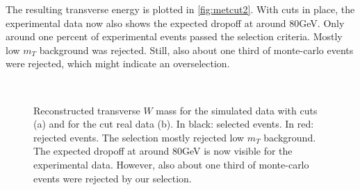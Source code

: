 \documentclass[twoside,        %
               BCOR12mm,       %
               ngerman,english, %
               fleqn,headsepline=false,footsepline=false
              ]{Vorlage/MFPREPORT}
\begin{document}
The resulting transverse energy is plotted in \cref{fig:metcut2}.
With cuts in place, the experimental data now also shows the expected dropoff
at around $80$\;GeV. Only around one percent of experimental events passed the
selection criteria. Mostly low $m_T$ background was rejected. Still, also about
one third of monte-carlo events were rejected, which might indicate an
overselection.

\begin{figure}
     \begin{center}
         \\ %
    \end{center}
    \caption{Reconstructed transverse $W$ mass for the simulated data with cuts
    (a) and for the cut real data (b). In black: selected events. In red:
    rejected events. The selection mostly rejected low $m_T$ background. The expected dropoff at around $80$\;GeV is now visible
    for the experimental data. However, also about one third of monte-carlo
    events were rejected by our selection.}
\end{figure}
\end{document}
